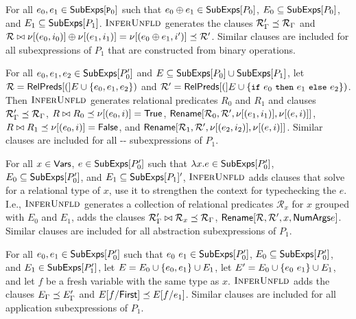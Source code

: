 For all $e_0, e_1 \in \subexps{ \cc{P}_0 }$ such that $e_0 \oplus e_1
\in \subexps{ P_0 }$, %
$E_0 \subseteq \subexps{ P_0 }$, and %
$E_1 \subseteq \subexps{ P_1 }$.
%
$\verifybnd$ generates the clauses
$\mathcal{R}'_{\Gamma} \subtype \mathcal{R}_{\Gamma}$ and 
$\mathcal{R} \joinctr \resvar{ (e_0, i_0) } \oplus \resvar{ (e_1, i_1)
} = \resvar{ (e_0 \oplus e_1, i') } \subtype \mathcal{R}'$.
%
Similar clauses are included for all subexpressions of $P_1$ that are
constructed from binary operations.

For all $e_0, e_1, e_2 \in \subexps{ P_0' }$ and $E \subseteq
\subexps{ P_0 } \union \subexps{ P_1 }$, let $\mathcal{R} =
\symrelpreds(E \union \elts{ e_0, e_1, e_2 })$ and $\mathcal{R}' =
\symrelpreds(E \union \elts{ \ite{e_0}{e_1}{e_2} })$.
%
Then $\verifybnd$ generates relational predicates $R_0$ and $R_1$ and
clauses
$\mathcal{R}'_{\Gamma} \subtype \mathcal{R}_{\Gamma}$,
$\ctrclause{ R }{ R_0 }{ \resvar{ (e_0, i) } = \true}$,
%
$\renamesub{ \mathcal{R}_0 }{ \mathcal{ R }' }{ \resvar{ (e_1, i_1) }
}{ \resvar{(e, i)} }$,
%
$\ctrclause{ R }{ R_1 }{ \resvar{ (e_0, i) } = \false}$, and
%
$\renamesub{ \mathcal{R}_1 }{ \mathcal{ R }' }{ \resvar{ (e_2, i_2) }
}{ \resvar{ (e, i) } }$.
%
Similar clauses are included for all --
subexpressions of $P_1$.

For all $x \in \vars$, %
$e \in \subexps{ P_0' }$ such that $\lambda x. e \in
\subexps{P_0'}$, %
$E_0 \subseteq \subexps{P_0'}$, and %
$E_1 \subseteq \subexps{P_1}'$, $\verifybnd$ adds clauses that solve
for a relational type of $x$, use it to strengthen the context for
typechecking the $e$.
%
I.e., $\verifybnd$ generates a collection of relational predicates
$\mathcal{R}_x$ for $x$ grouped with $E_0$ and $E_1$, %
adds the clauses
$\mathcal{R}'_{\Gamma} \joinctr \mathcal{R}_x \subtype
\mathcal{R}_{\Gamma}$, %
$\renamesub{ \mathcal{R} }{ \mathcal{R}' }{ x }{ \argnum{e} }$.
%
Similar clauses are included for all abstraction subexpressions of
$P_1$.

For all $e_0, e_1 \in \subexps{P_0'}$ such that $e_0\ e_1 \in
\subexps{P_0'}$, %
$E_0 \subseteq \subexps{P_0'}$, and %
$E_1 \in \subexps{P_1'}$, let $E = E_0 \union \elts{ e_0, e_1 }
\union E_1$, %
let $E' = E_0 \union \elts{ e_0\ e_1 } \union E_1$, and %
let $f$ be a fresh variable with the same type as $x$.
%
$\verifybnd$ adds the clauses 
$E_{\Gamma} \subtype E'_{\Gamma}$ and %
$\replace{ E }{ \firstarg{e_0} }{ f } \subtype \replace{ E }{ e_1 }{ f
}$.
%
%
Similar clauses are included for all application subexpressions of
$P_1$.

